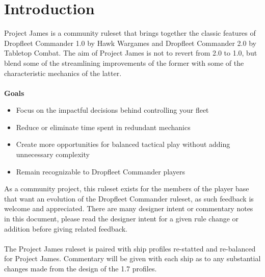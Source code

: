 \chapter{Introduction}

Project James is a community ruleset that brings together the classic features of Dropfleet Commander 1.0 by Hawk Wargames and Dropfleet Commander 2.0 by Tabletop Combat. The aim of Project James is not to revert from 2.0 to 1.0, but blend some of the streamlining improvements of the former with some of the characteristic mechanics of the latter.
\\\\
\textbf{Goals}
\begin{itemize}
	\item Focus on the impactful decisions behind controlling your fleet
	\item Reduce or eliminate time spent in redundant mechanics
	\item Create more opportunities for balanced tactical play without adding unnecessary complexity
	\item Remain recognizable to Dropfleet Commander players
\end{itemize}

As a community project, this ruleset exists for the members of the player base that want an evolution of the Dropfleet Commander ruleset, as such feedback is welcome and appreciated. There are many designer intent or commentary notes in this document, please read the designer intent for a given rule change or addition before giving related feedback.
\\\\
The Project James ruleset is paired with ship profiles re-statted and re-balanced for Project James. Commentary will be given with each ship as to any substantial changes made from the design of the 1.7 profiles.